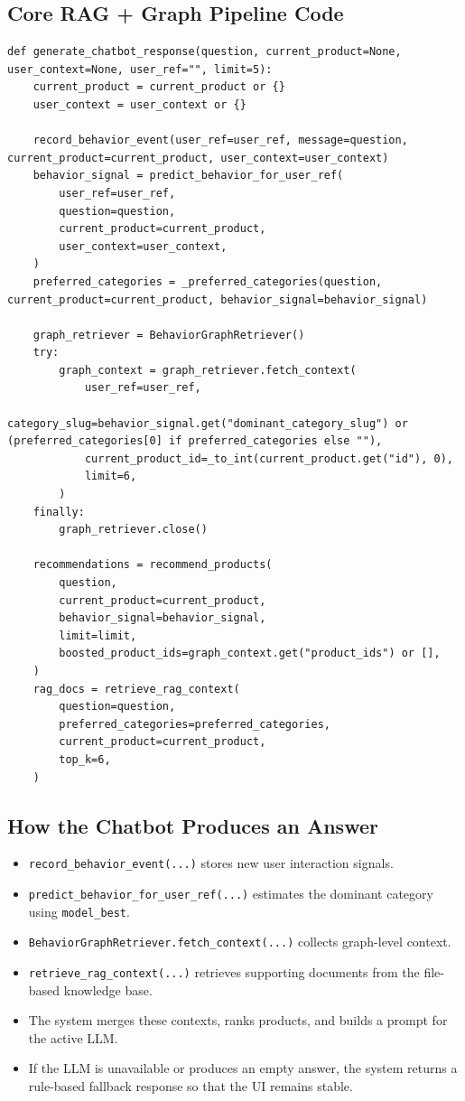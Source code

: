 \documentclass[12pt,a4paper]{article}
\begin{document}
\subsection{Core RAG + Graph Pipeline Code}
\begin{lstlisting}[caption={Core chatbot response pipeline}]
def generate_chatbot_response(question, current_product=None, user_context=None, user_ref="", limit=5):
    current_product = current_product or {}
    user_context = user_context or {}

    record_behavior_event(user_ref=user_ref, message=question, current_product=current_product, user_context=user_context)
    behavior_signal = predict_behavior_for_user_ref(
        user_ref=user_ref,
        question=question,
        current_product=current_product,
        user_context=user_context,
    )
    preferred_categories = _preferred_categories(question, current_product=current_product, behavior_signal=behavior_signal)

    graph_retriever = BehaviorGraphRetriever()
    try:
        graph_context = graph_retriever.fetch_context(
            user_ref=user_ref,
            category_slug=behavior_signal.get("dominant_category_slug") or (preferred_categories[0] if preferred_categories else ""),
            current_product_id=_to_int(current_product.get("id"), 0),
            limit=6,
        )
    finally:
        graph_retriever.close()

    recommendations = recommend_products(
        question,
        current_product=current_product,
        behavior_signal=behavior_signal,
        limit=limit,
        boosted_product_ids=graph_context.get("product_ids") or [],
    )
    rag_docs = retrieve_rag_context(
        question=question,
        preferred_categories=preferred_categories,
        current_product=current_product,
        top_k=6,
    )
\end{lstlisting}

\subsection{How the Chatbot Produces an Answer}
\begin{itemize}
  \item \texttt{record\_behavior\_event(...)} stores new user interaction signals.
  \item \texttt{predict\_behavior\_for\_user\_ref(...)} estimates the dominant category using \texttt{model\_best}.
  \item \texttt{BehaviorGraphRetriever.fetch\_context(...)} collects graph-level context.
  \item \texttt{retrieve\_rag\_context(...)} retrieves supporting documents from the file-based knowledge base.
  \item The system merges these contexts, ranks products, and builds a prompt for the active LLM.
  \item If the LLM is unavailable or produces an empty answer, the system returns a rule-based fallback response so that the UI remains stable.
\end{itemize}
\end{document}
